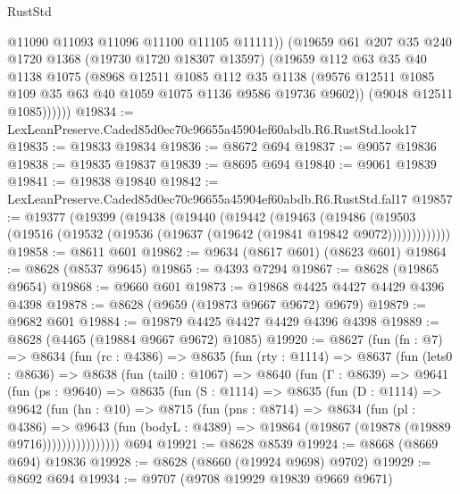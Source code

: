 \begin{lexlean}{RustStd}
\begin{coremodule}
              @11090
              @11093
              @11096
              @11100
              @11105
              @11111))
          (@19659
            @61
            @207
            @35
            @240
            @1720
            @1368
            (@19730 @1720 @18307 @13597)
            (@19659
              @112
              @63
              @35
              @40
              @1138
              @1075
              (@8968
                @12511
                @1085
                @112
                @35
                @1138
                (@9576 @12511 @1085 @109 @35 @63 @40 @1059 @1075 @1136 @9586 @19736 @9602))
              (@9048 @12511 @1085))))))
@19834 := LexLeanPreserve.Caded85d0ec70c96655a45904ef60abdb.R6.RustStd.look17
@19835 := @19833 @19834
@19836 := @8672 @694
@19837 := @9057 @19836
@19838 := @19835 @19837
@19839 := @8695 @694
@19840 := @9061 @19839
@19841 := @19838 @19840
@19842 := LexLeanPreserve.Caded85d0ec70c96655a45904ef60abdb.R6.RustStd.fal17
@19857 := @19377
    (@19399
      (@19438
        (@19440
          (@19442
            (@19463
              (@19486
                (@19503 (@19516 (@19532 (@19536 (@19637 (@19642 (@19841 @19842 @9072)))))))))))))
@19858 := @8611 @601
@19862 := @9634 (@8617 @601) (@8623 @601)
@19864 := @8628 (@8537 @9645)
@19865 := @4393 @7294
@19867 := @8628 (@19865 @9654)
@19868 := @9660 @601
@19873 := @19868 @4425 @4427 @4429 @4396 @4398
@19878 := @8628 (@9659 (@19873 @9667 @9672) @9679)
@19879 := @9682 @601
@19884 := @19879 @4425 @4427 @4429 @4396 @4398
@19889 := @8628 (@4465 (@19884 @9667 @9672) @1085)
@19920 := @8627
    (fun (fn : @7) =>
    @8634
      (fun (rc : @4386) =>
      @8635
        (fun (rty : @1114) =>
        @8637
          (fun (lets0 : @8636) =>
          @8638
            (fun (tail0 : @1067) =>
            @8640
              (fun (Γ : @8639) =>
              @9641
                (fun (ps : @9640) =>
                @8635
                  (fun (S : @1114) =>
                  @8635
                    (fun (D : @1114) =>
                    @9642
                      (fun (hn : @10) =>
                      @8715
                        (fun (pns : @8714) =>
                        @8634
                          (fun (pl : @4386) =>
                          @9643
                            (fun (bodyL : @4389) =>
                            @19864 (@19867 (@19878 (@19889 @9716))))))))))))))))
    @694
@19921 := @8628 @8539
@19924 := @8668 (@8669 @694) @19836
@19928 := @8628 (@8660 (@19924 @9698) @9702)
@19929 := @8692 @694
@19934 := @9707 (@9708 @19929 @19839 @9669 @9671)

\end{coremodule}
\end{lexlean}
